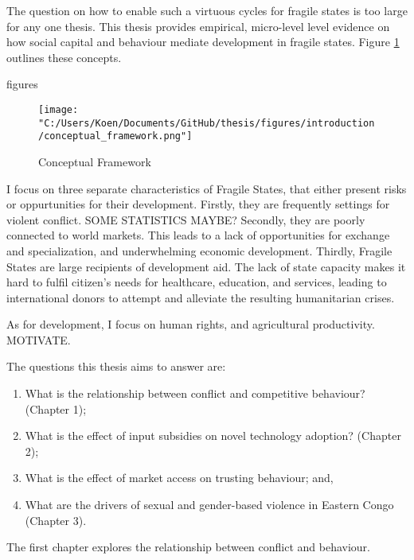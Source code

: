 The question on how to enable such a virtuous cycles for fragile states is too large for any one thesis. This thesis provides empirical, micro-level level evidence on how social capital and behaviour mediate development in fragile states. Figure \ref{fig:intro_framework} outlines these concepts. 

figures
\begin{figure}[htb]
  \texttt{[image: "C:/Users/Koen/Documents/GitHub/thesis/figures/introduction/conceptual\_framework.png"]}
  \caption{Conceptual Framework}
  \label{fig:intro_framework}
\end{figure}


I focus on three separate characteristics of Fragile States, that either present risks or oppurtunities for their development. Firstly, they are frequently settings for violent conflict. SOME STATISTICS MAYBE? Secondly, they are poorly connected to world markets. This leads to a lack of opportunities for exchange and specialization, and underwhelming economic development. Thirdly, Fragile States are large recipients of development aid. The lack of state capacity makes it hard to fulfil citizen's needs for healthcare, education, and services, leading to international donors to attempt and alleviate the resulting humanitarian crises. 

As for development, I focus on human rights, and agricultural productivity. MOTIVATE.

The questions this thesis aims to answer are:
\begin{enumerate}
	\item What is the relationship between conflict and competitive behaviour? (Chapter 1);
	\item What is the effect of input subsidies on novel technology adoption? (Chapter 2);
	\item What is the effect of market access on trusting behaviour; and,
	\item What are the drivers of sexual and gender-based violence in Eastern Congo (Chapter 3).
\end{enumerate}










The first chapter explores the relationship between conflict and behaviour. %

